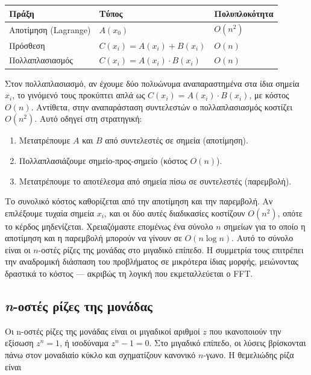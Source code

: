 \begin{longtable}[]{@{}lll@{}}
Πράξη & Τύπος & Πολυπλοκότητα \\
\endhead
\endlastfoot
Αποτίμηση (Lagrange) & \(A(x_0)\) & \(O(n^2)\) \\
Πρόσθεση & \(C(x_i) = A(x_i) + B(x_i)\) & \(O(n)\) \\
Πολλαπλασιασμός & \(C(x_i) = A(x_i) \cdot B(x_i)\) & \(O(n)\) \\
\end{longtable}

Στον πολλαπλασιασμό, αν έχουμε δύο πολυώνυμα αναπαραστημένα στα ίδια
σημεία \(x_i\), το γινόμενό τους προκύπτει απλά ως
\(C(x_i) = A(x_i) \cdot B(x_i)\), με κόστος \(O(n)\). Αντίθετα, στην
αναπαράσταση συντελεστών ο πολλαπλασιασμός κοστίζει \(O(n^2)\). Αυτό
οδηγεί στη στρατηγική:

\begin{enumerate}
\def\labelenumi{\arabic{enumi}.}
\item
  Μετατρέπουμε \(A\) και \(B\) από συντελεστές σε σημεία (αποτίμηση).
\item
  Πολλαπλασιάζουμε σημείο-προς-σημείο (κόστος \(O(n)\)).
\item
  Μετατρέπουμε το αποτέλεσμα από σημεία πίσω σε συντελεστές (παρεμβολή).
\end{enumerate}

Το συνολικό κόστος καθορίζεται από την αποτίμηση και την παρεμβολή. Αν
επιλέξουμε τυχαία σημεία \(x_i\), και οι δύο αυτές διαδικασίες κοστίζουν
\(O(n^2)\), οπότε το κέρδος μηδενίζεται. Χρειαζόμαστε επομένως ένα
σύνολο \(n\) σημείων για το οποίο η αποτίμηση και η παρεμβολή μπορούν να
γίνουν σε \(O(n \log n)\). Αυτό το σύνολο είναι οι \(n\)-οστές ρίζες της
μονάδας στο μιγαδικό επίπεδο. Η συμμετρία τους επιτρέπει την αναδρομική
διάσπαση του προβλήματος σε μικρότερα ίδιας μορφής, μειώνοντας δραστικά
το κόστος --- ακριβώς τη λογική που εκμεταλλεύεται ο FFT.

\subsection{{\itshape n}-οστές ρίζες της
μονάδας}\label{n-ux3bfux3c3ux3c4ux3adux3c2-ux3c1ux3afux3b6ux3b5ux3c2-ux3c4ux3b7ux3c2-ux3bcux3bfux3bdux3acux3b4ux3b1ux3c2}

Οι n-οστές ρίζες της μονάδας είναι οι μιγαδικοί αριθμοί \(z\) που
ικανοποιούν την εξίσωση \(z^n = 1\), ή ισοδύναμα \(z^n - 1 = 0\). Στο
μιγαδικό επίπεδο, οι λύσεις βρίσκονται πάνω στον μοναδιαίο κύκλο και
σχηματίζουν κανονικό \(n\)-γωνο. Η θεμελιώδης ρίζα είναι

